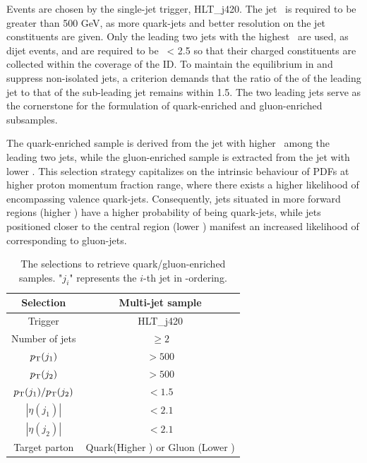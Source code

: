 Events are chosen by the single-jet trigger, HLT\_j420. The jet \pt~is  required to be greater than 500 GeV, as more quark-jets and better resolution on the jet constituents are given. Only the leading two jets with the highest \pt~are used, as dijet events, and are required to be  \abseta~< 2.5 so that their charged constituents are collected within the coverage of the ID. To maintain the equilibrium in \pt and suppress non-isolated jets, a criterion demands that the ratio of the \pt of the leading jet to that of the sub-leading jet remains within 1.5. The two leading \pt jets serve as the cornerstone for the formulation of quark-enriched and gluon-enriched subsamples.

The quark-enriched sample is derived from the jet with higher \abseta~among the leading two jets, while the gluon-enriched sample is extracted from the jet with lower \abseta. This selection strategy capitalizes on the intrinsic behaviour of PDFs at higher proton momentum fraction range, where there exists a higher likelihood of encompassing valence quark-jets. Consequently, jets situated in more forward regions (higher \abseta) have a higher probability of being quark-jets, while jets positioned closer to the central region (lower \abseta) manifest an increased likelihood of corresponding to gluon-jets.







\begin{table}[htb]
	\centering
	
\begin{tabular}{|c|c|}
	\hline
	Selection & Multi-jet sample  \\ 
	\hline
	 Trigger    & HLT\_j420 \\ 
	 Number of jets         & $\geq2$ \\ 
	 $p_{\mathrm{T}}(j_1)$             & $>500$ \\ 
	 $p_{\mathrm{T}}(j_2)$             & $>500$ \\ 
	 $p_{\mathrm{T}}(j_1)/p_{\mathrm{T}}(j_2)$   & $<1.5$ \\ 
	 $|\eta(j_1)|$         &  $<2.1$   \\ 
	 $|\eta(j_2)|$         &  $<2.1$   \\ \hline
	 Target parton         & Quark(Higher \abseta )  or Gluon (Lower \abseta )       \\
	\hline
\end{tabular}
\caption{
	The selections to retrieve quark/gluon-enriched samples.
	"$j_i$" represents the $i$-th jet in \pt-ordering.
}
\label{tab:QG-sample}
\end{table}


